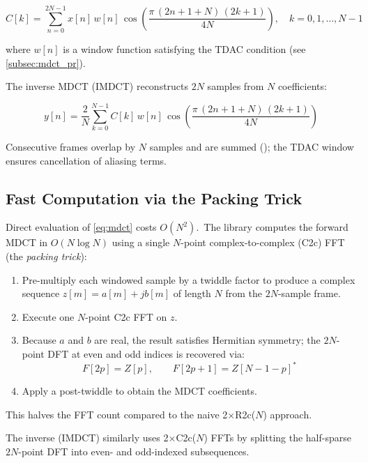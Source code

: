 \begin{equation}
  \label{eq:mdct}
  C[k] = \sum_{n=0}^{2N-1} x[n]\, w[n]\, \cos\!\left(
    \frac{\pi\,(2n+1+N)\,(2k+1)}{4N}
  \right), \quad k = 0, 1, \ldots, N-1
\end{equation}

where $w[n]$ is a window function satisfying the TDAC condition
(see \cref{subsec:mdct_pr}).

The inverse MDCT (IMDCT) reconstructs $2N$ samples from $N$ coefficients:

\begin{equation}
  \label{eq:imdct}
  y[n] = \frac{2}{N} \sum_{k=0}^{N-1} C[k]\, w[n]\, \cos\!\left(
    \frac{\pi\,(2n+1+N)\,(2k+1)}{4N}
  \right)
\end{equation}

Consecutive frames overlap by $N$ samples and are summed
(); the TDAC window ensures cancellation of
aliasing terms.

\subsection{Fast Computation via the Packing Trick}\label{subsec:mdct_fft}

Direct evaluation of \cref{eq:mdct} costs $O(N^2)$.\ The library
computes the forward MDCT in $O(N \log N)$ using a single $N$-point
complex-to-complex (C2c) FFT (the \emph{packing trick}):

\begin{enumerate}
  \item Pre-multiply each windowed sample by a twiddle factor to produce
    a complex sequence $z[m] = a[m] + jb[m]$ of length $N$ from the
    $2N$-sample frame.
  \item Execute one $N$-point C2c FFT on $z$.
  \item Because $a$ and $b$ are real, the result satisfies Hermitian
    symmetry; the $2N$-point DFT at even and odd indices is recovered via:
    \begin{equation}
      F[2p] = Z[p], \qquad F[2p+1] = Z[N-1-p]^*
    \end{equation}
  \item Apply a post-twiddle to obtain the MDCT coefficients.
\end{enumerate}

This halves the FFT count compared to the naive 2$\times$R2c($N$) approach.

The inverse (IMDCT) similarly uses 2$\times$C2c($N$) FFTs by splitting
the half-sparse $2N$-point DFT into even- and odd-indexed subsequences.

